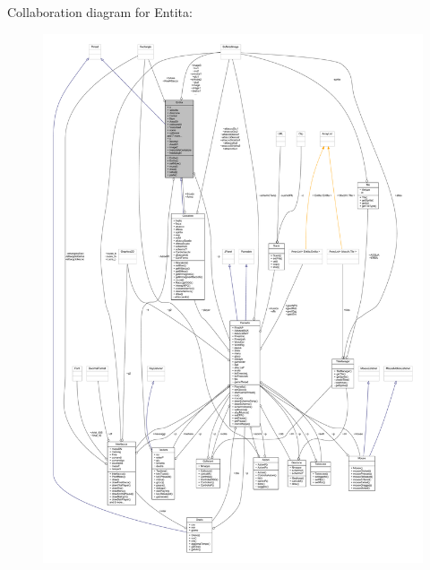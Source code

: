 Collaboration diagram for Entita\+:
\nopagebreak
\begin{figure}[H]
\begin{center}
\leavevmode
\includegraphics[width=350pt]{class_entita_1_1_entita__coll__graph}
\end{center}
\end{figure}
